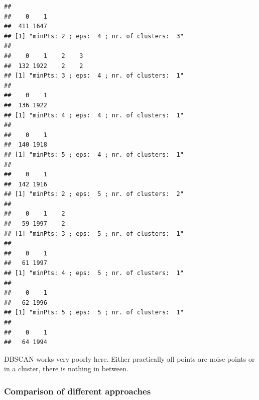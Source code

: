 \documentclass[
]{article}
\begin{document}
\begin{verbatim}
## 
##    0    1 
##  411 1647 
## [1] "minPts: 2 ; eps:  4 ; nr. of clusters:  3"
## 
##    0    1    2    3 
##  132 1922    2    2 
## [1] "minPts: 3 ; eps:  4 ; nr. of clusters:  1"
## 
##    0    1 
##  136 1922 
## [1] "minPts: 4 ; eps:  4 ; nr. of clusters:  1"
## 
##    0    1 
##  140 1918 
## [1] "minPts: 5 ; eps:  4 ; nr. of clusters:  1"
## 
##    0    1 
##  142 1916 
## [1] "minPts: 2 ; eps:  5 ; nr. of clusters:  2"
## 
##    0    1    2 
##   59 1997    2 
## [1] "minPts: 3 ; eps:  5 ; nr. of clusters:  1"
## 
##    0    1 
##   61 1997 
## [1] "minPts: 4 ; eps:  5 ; nr. of clusters:  1"
## 
##    0    1 
##   62 1996 
## [1] "minPts: 5 ; eps:  5 ; nr. of clusters:  1"
## 
##    0    1 
##   64 1994
\end{verbatim}

DBSCAN works very poorly here. Either practically all points are noise
points or in a cluster, there is nothing in between.

\hypertarget{comparison-of-different-approaches}{%
\subsubsection{Comparison of different
approaches}\label{comparison-of-different-approaches}}
\end{document}
